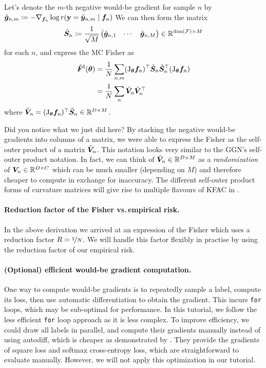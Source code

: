 Let's denote the $m$-th negative would-be gradient for sample $n$ by $\tilde{{\bm{g}}}_{n,m} \coloneq -\nabla_{{\bm{f}}_n} \log r({\mathbf{y}} = \tilde{{\bm{y}}}_{n,m} \mid {\bm{f}}_n)$
We can then form the matrix
\begin{align*}
  \tilde{{\bm{S}}}_n
  \coloneq
  \frac{1}{\sqrt{M}}
  \begin{pmatrix}
    \tilde{{\bm{g}}}_{n,1} & \cdots & \tilde{{\bm{g}}}_{n,M}
  \end{pmatrix}
  \in {\mathbb{R}}^{\dim({\mathcal{F}}) \times M}
\end{align*}
for each $n$, and express the MC Fisher as
\begin{align*}
  \tilde{{\bm{F}}}^{\text{I}}({\bm{\theta}})
  & =
    \frac{1}{N} \sum_{n,m}
    (\mathrm{J}_{{\bm{\theta}}}{\bm{f}}_n)^{\top}
    \tilde{{\bm{S}}}_n
    \tilde{{\bm{S}}}_n^{\top}
    (\mathrm{J}_{{\bm{\theta}}}{\bm{f}}_n)
  \\
  & =
    \frac{1}{N} \sum_n
    \tilde{{\bm{V}}}_n
    \tilde{{\bm{V}}}_n^{\top}
\end{align*}
where $\tilde{{\bm{V}}}_n = (\mathrm{J}_{{\bm{\theta}}}{\bm{f}}_n)^{\top} \tilde{{\bm{S}}}_n \in {\mathbb{R}}^{D \times M}$.

Did you notice what we just did here?
By stacking the negative would-be gradients into columns of a matrix, we were able to express the Fisher as the self-outer product of a matrix $\tilde{{\bm{V}}}_n$.
This notation looks very similar to the GGN's self-outer product notation.
In fact, we can think of $\tilde{{\bm{V}}}_n \in {\mathbb{R}}^{D \times M}$ as a \emph{randomization} of ${\bm{V}}_n \in {\mathbb{R}}^{D \times C}$ which can be much smaller (depending on $M$) and therefore cheaper to compute in exchange for inaccuracy.
The different self-outer product forms of curvature matrices will give rise to multiple flavours of KFAC in .

\paragraph{Reduction factor of the Fisher vs.\,empirical risk.}
In the above derivation we arrived at an expression of the Fisher which uses a reduction factor $R = \nicefrac{1}{N}$.
We will handle this factor flexibly in practise by using the reduction factor of our empirical risk.

\paragraph{(Optional) efficient would-be gradient computation.}
One way to compute would-be gradients is to repeatedly sample a label, compute its loss, then use automatic differentiation to obtain the gradient.
This incurs \texttt{for} loops, which may be sub-optimal for performance.
In this tutorial, we follow the less efficient \texttt{for} loop approach as it is less complex.
To improve efficiency, we could draw all labels in parallel, and compute their gradients manually instead of using autodiff, which is cheaper as demonstrated by .
They provide the gradients of square loss and softmax cross-entropy loss, which are straightforward to evaluate manually.
However, we will not apply this optimization in our tutorial.

